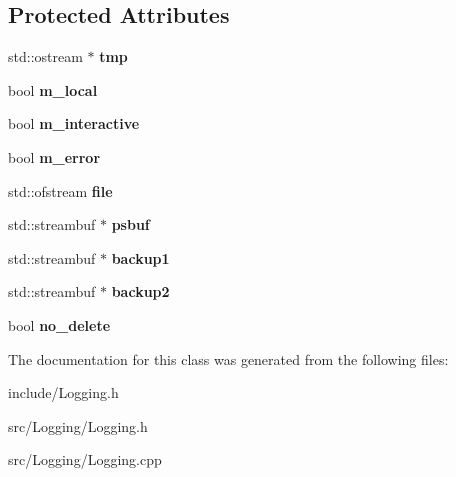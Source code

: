 \subsection*{Protected Attributes}
\begin{DoxyCompactItemize}
\item 
\hypertarget{classLogging_1_1TFStreamBuf_aa442f9ceb9965328eb4742b26c04821e}{std\-::ostream $\ast$ {\bfseries tmp}}\label{classLogging_1_1TFStreamBuf_aa442f9ceb9965328eb4742b26c04821e}

\item 
\hypertarget{classLogging_1_1TFStreamBuf_a0c76a8d5f178b710f32b0870acb63be1}{bool {\bfseries m\-\_\-local}}\label{classLogging_1_1TFStreamBuf_a0c76a8d5f178b710f32b0870acb63be1}

\item 
\hypertarget{classLogging_1_1TFStreamBuf_aadc62ce994f9b3dcb2b556066d4012f6}{bool {\bfseries m\-\_\-interactive}}\label{classLogging_1_1TFStreamBuf_aadc62ce994f9b3dcb2b556066d4012f6}

\item 
\hypertarget{classLogging_1_1TFStreamBuf_aba7ca93e1a4f7fb847429c430487f533}{bool {\bfseries m\-\_\-error}}\label{classLogging_1_1TFStreamBuf_aba7ca93e1a4f7fb847429c430487f533}

\item 
\hypertarget{classLogging_1_1TFStreamBuf_a8dc31ada39c6171f2f58f4f581960f8b}{std\-::ofstream {\bfseries file}}\label{classLogging_1_1TFStreamBuf_a8dc31ada39c6171f2f58f4f581960f8b}

\item 
\hypertarget{classLogging_1_1TFStreamBuf_a4153ced2cff859845d218c2bc3210283}{std\-::streambuf $\ast$ {\bfseries psbuf}}\label{classLogging_1_1TFStreamBuf_a4153ced2cff859845d218c2bc3210283}

\item 
\hypertarget{classLogging_1_1TFStreamBuf_a5aafb40c0124929ddc22dd3140186b23}{std\-::streambuf $\ast$ {\bfseries backup1}}\label{classLogging_1_1TFStreamBuf_a5aafb40c0124929ddc22dd3140186b23}

\item 
\hypertarget{classLogging_1_1TFStreamBuf_a788a2b30acb9c1eb2a7a2d3ab6828ef9}{std\-::streambuf $\ast$ {\bfseries backup2}}\label{classLogging_1_1TFStreamBuf_a788a2b30acb9c1eb2a7a2d3ab6828ef9}

\item 
\hypertarget{classLogging_1_1TFStreamBuf_aaa677fac0be626aac038b528192dac35}{bool {\bfseries no\-\_\-delete}}\label{classLogging_1_1TFStreamBuf_aaa677fac0be626aac038b528192dac35}

\end{DoxyCompactItemize}


The documentation for this class was generated from the following files\-:\begin{DoxyCompactItemize}
\item 
include/Logging.\-h\item 
src/\-Logging/Logging.\-h\item 
src/\-Logging/Logging.\-cpp\end{DoxyCompactItemize}
